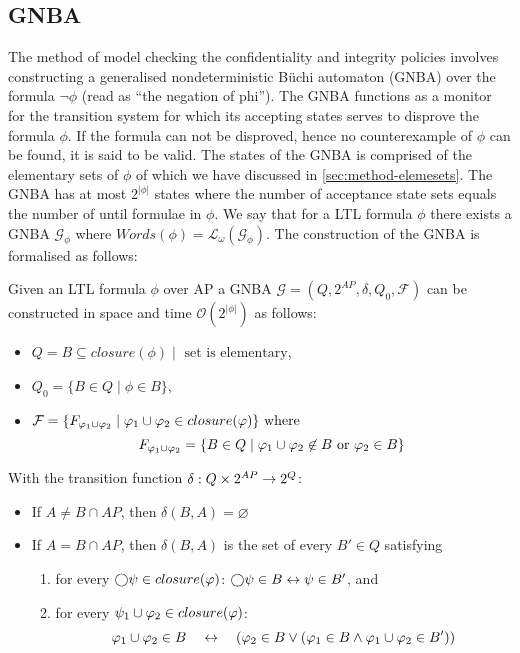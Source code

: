 \subsection{GNBA}
The method of model checking the confidentiality and integrity policies involves constructing a generalised nondeterministic Büchi automaton (GNBA) over the formula $\lnot\phi$ (read as ``the negation of phi''). The GNBA functions as a monitor for the transition system for which its accepting states serves to disprove the formula $\phi$. If the formula can not be disproved, hence no counterexample of $\phi$ can be found, it is said to be valid. The states of the GNBA is comprised of the elementary sets of $\phi$ of which we have discussed in \autoref{sec:method-elemesets}. The GNBA has at most $2^{|\phi|}$ states where the number of acceptance state sets equals the number of until formulae in $\phi$. We say that for a LTL formula $\phi$ there exists a GNBA $\mathcal{G_\phi}$ where $Words(\phi)=\mathcal{L}_\omega(\mathcal{G_\phi})$. The construction of the GNBA is formalised as follows:
\begin{definition}
\label{def:ltl-to-gnba}
Given an LTL formula $\phi$ over AP a GNBA $\mathcal{G}=(Q,2^{AP},\delta,Q_0,\mathcal{F})$ can be constructed in space and time $\mathcal{O}(2^{|\phi|})$ as follows:
\begin{itemize}
    \item $Q = B \subseteq closure(\phi) \mid \text{ set is elementary}$,
    \item $Q_0 = \{ B \in Q \mid \phi \in B \}$,
    \item $\mathcal{F} = \{F_{\varphi_1 \cup \varphi_2} \mid \varphi_1 \cup \varphi_2 \in closure(\varphi)\} \text{ where }$
    \begin{equation*}
        F_{\varphi_1 \cup \varphi_2} = \{B \in Q \mid \varphi_1 \cup \varphi_2 \not\in B \text{ or } \varphi_2 \in B\}
    \end{equation*}
\end{itemize}
With the transition function $\delta : Q \times 2^{AP} \rightarrow 2^Q$:
\begin{itemize}
    \item If $A \neq B \cap AP$, then $\delta(B,A)=\varnothing$
    \item If $A = B \cap AP$, then $\delta(B,A)$ is the set of every $B'\in Q$ satisfying
    \begin{enumerate}
        \item for every $\bigcirc\psi \in closure(\varphi)$: $\bigcirc\psi \in B \leftrightarrow \psi \in B'$, and
        \item for every $\psi_1 \cup \varphi_2 \in closure(\varphi)$:
        \begin{equation*}
            \varphi_1 \cup \varphi_2 \in B \quad\leftrightarrow\quad (\varphi_2 \in B \lor (\varphi_1 \in B \land \varphi_1 \cup \varphi_2 \in B'))
        \end{equation*}
    \end{enumerate}
\end{itemize}
\end{definition}


